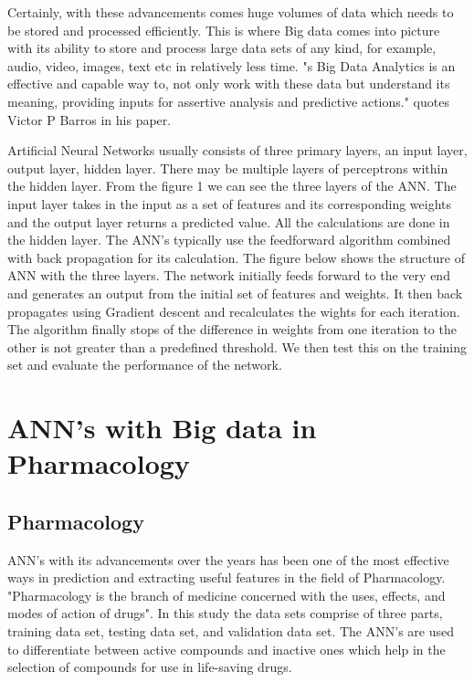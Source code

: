 \documentclass[sigconf]{acmart}
\begin{document}
Certainly, with these advancements comes huge volumes of data which needs to be stored and processed efficiently. This is where Big data comes into picture with its ability to store and process large data sets of any kind, for example, audio, video, images, text etc in relatively less time. "s Big Data Analytics is an effective and capable way to, not only work with these data but understand its meaning, providing inputs for assertive analysis and predictive actions."\cite{Barros2016} quotes Victor P Barros in his paper.

Artificial Neural Networks usually consists of three primary layers, an input layer, output layer, hidden layer. There may be multiple layers of perceptrons within the hidden layer. From the figure 1 we can see the three layers of the ANN. The input layer takes in the input as a set of features and its corresponding weights and the output layer returns a predicted value. All the calculations are done in the hidden layer. The ANN's typically use the feedforward algorithm combined with back propagation for its calculation. The figure below shows the structure of ANN with the three layers. The network initially feeds forward to the very end and generates an output from the initial set of features and weights. It then back propagates using Gradient descent and recalculates the wights for each iteration. The algorithm finally stops of the difference in weights from one iteration to the other is not greater than a predefined threshold. We then test this on the training set and evaluate the performance of the network.


\section{ANN's with Big data in Pharmacology}

\subsection{Pharmacology}
ANN's with its advancements over the years has been one of the most effective ways in prediction and extracting useful features in the field of Pharmacology. "Pharmacology is the branch of medicine concerned with the uses, effects, and modes of action of drugs"\cite{www-wiki}. In this study the data sets comprise of three parts, training data set, testing data set, and validation data set. The ANN's are used to differentiate between active compounds and inactive ones which help in the selection of compounds for use in life-saving drugs.\cite{LucasAntonPastur-Romay2016}
\end{document}
